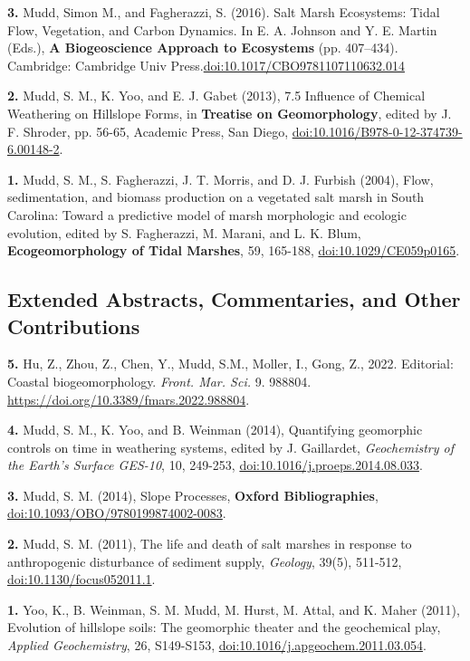 \documentclass[10pt, a4paper]{article}
\newcommand{\years}[1]{\marginnote{\scriptsize #1}}
\begin{document}
\years{2016}\hangindent=0.7cm\textbf{3. }Mudd, Simon M., and Fagherazzi, S. (2016). Salt Marsh Ecosystems: Tidal Flow, Vegetation, and Carbon Dynamics. In E. A. Johnson and Y. E. Martin (Eds.), \textbf{A Biogeoscience Approach to Ecosystems} (pp. 407--434). Cambridge: Cambridge Univ Press.\href{https://doi.org/10.1017/CBO9781107110632.014}{doi:10.1017/CBO9781107110632.014}\par

\years{2013}\hangindent=0.7cm\textbf{2.} Mudd, S. M., K. Yoo, and E. J. Gabet (2013), 7.5 Influence of Chemical Weathering on Hillslope Forms, in \textbf{Treatise on Geomorphology}, edited by J. F. Shroder, pp. 56-65, Academic Press, San Diego, \href{http://dx.doi.org/doi:10.1016/B978-0-12-374739-6.00148-2}{doi:10.1016/B978-0-12-374739-6.00148-2}.\par

\years{2004}\hangindent=0.7cm\textbf{1.} Mudd, S. M., S. Fagherazzi, J. T. Morris, and D. J. Furbish (2004), Flow, sedimentation, and biomass production on a vegetated salt marsh in South Carolina: Toward a predictive model of marsh morphologic and ecologic evolution, edited by S. Fagherazzi, M. Marani, and L. K. Blum, \textbf{Ecogeomorphology of Tidal Marshes}, 59, 165-188, \href{http://dx.doi.org/doi:10.1029/CE059p0165}{doi:10.1029/CE059p0165}.\par

\subsection*{Extended Abstracts, Commentaries, and Other Contributions}
\noindent
\years{2022}\hangindent=0.7cm\textbf{5.} Hu, Z., Zhou, Z., Chen, Y., Mudd, S.M., Moller, I., Gong, Z., 2022. Editorial: Coastal biogeomorphology. \textit{Front. Mar. Sci.} 9. 988804. \href{https://doi.org/10.3389/fmars.2022.988804}{https://doi.org/10.3389/fmars.2022.988804}.\par
\years{2014}\hangindent=0.7cm\textbf{4.} Mudd, S. M., K. Yoo, and B. Weinman (2014), Quantifying geomorphic controls on time in weathering systems, edited by J. Gaillardet, \textit{Geochemistry of the Earth's Surface GES-10}, 10, 249-253, \href{http://dx.doi.org/doi:10.1016/j.proeps.2014.08.033}{doi:10.1016/j.proeps.2014.08.033}.\par
\hangindent=0.7cm\textbf{3.} Mudd, S. M. (2014), Slope Processes, \textbf{Oxford Bibliographies}, \href{http://dx.doi.org/doi:10.1093/OBO/9780199874002-0083}{doi:10.1093/OBO/9780199874002-0083}.\par 
\years{2011}\hangindent=0.7cm\textbf{2.} Mudd, S. M. (2011), The life and death of salt marshes in response to anthropogenic disturbance of sediment supply, \textit{Geology}, 39(5), 511-512, \href{http://dx.doi.org/doi:10.1130/focus052011.1}{doi:10.1130/focus052011.1}.\par
\years{2009}\hangindent=0.7cm\textbf{1.} Yoo, K., B. Weinman, S. M. Mudd, M. Hurst, M. Attal, and K. Maher (2011), Evolution of hillslope soils: The geomorphic theater and the geochemical play, \textit{Applied Geochemistry}, 26, S149-S153, \href{http://dx.doi.org/doi:10.1016/j.apgeochem.2011.03.054}{doi:10.1016/j.apgeochem.2011.03.054}.\par

\vfill{}
\end{document}
